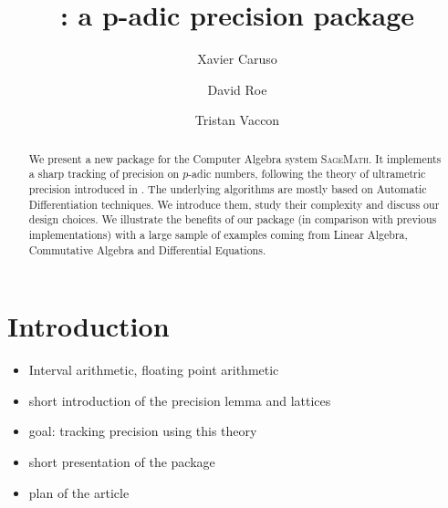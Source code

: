 \documentclass[sigconf]{acmart}
\newcommand{\sage}{\textsc{SageMath}\xspace}
\newcommand{\ZpL}{\text{\rm \tt ZpL}\xspace}
\theoremstyle{definition}
\begin{document}
\title{\ZpL: a p-adic precision package}

\author{Xavier Caruso}
\author{David Roe}
\author{Tristan Vaccon}



\begin{abstract}
We present a new package \ZpL for the Computer Algebra system \sage. It 
implements a sharp tracking of precision on $p$-adic numbers, following 
the theory of ultrametric precision introduced in \cite{padicprec}. The 
underlying algorithms are mostly based on Automatic Differentiation 
techniques. We introduce them, study their complexity and discuss our 
design choices.
We illustrate the benefits of our package (in comparison with previous 
implementations) with a large sample of examples coming from Linear 
Algebra, Commutative Algebra and Differential Equations.
\end{abstract}

\maketitle

\section{Introduction}

\begin{itemize}
\item Interval arithmetic, floating point arithmetic
\item short introduction of the precision lemma and lattices
\item goal: tracking precision using this theory
\item short presentation of the package
\item plan of the article
\end{itemize}
\end{document}
